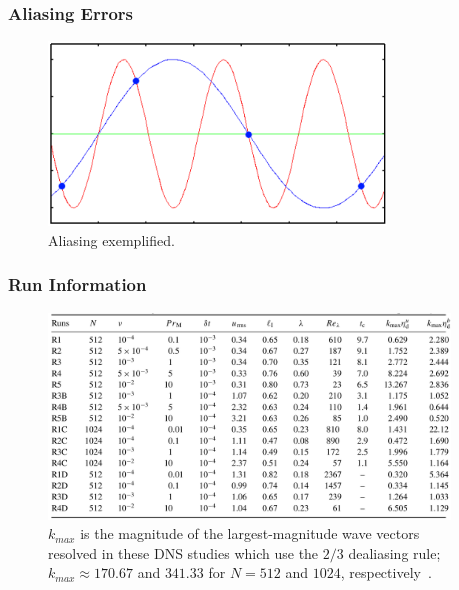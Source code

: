 \documentclass{beamer}
\begin{document}
\begin{frame}
 \frametitle{Aliasing Errors}
  
 \begin{figure}[t]
  \includegraphics[width=0.8\textwidth]{img/aliasing}
  \caption{Aliasing exemplified.}
  \centering
 \end{figure}
  
\end{frame}

\begin{frame}
 \frametitle{Run Information}
  
 \begin{figure}[t]
  \includegraphics[width=0.95\textwidth]{img/run_info}
  \caption{$k_{max}$ is the magnitude of the largest-magnitude wave vectors resolved in these DNS studies which use the $2/3$ dealiasing rule; $k_{max} \approx 170.67$ and $341.33$ for $N = 512$ and $1024$, respectively~\cite{sahoo2011systematics}.}
  \centering
 \end{figure}
  
\end{frame}
\end{document}
